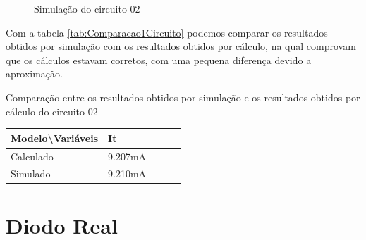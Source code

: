 \begin{figure}[H]
    \centering
    \caption{Simulação do circuito 02}
    \vspace{-0.3cm}
    \label{fig:SimulacaoCircuito02}
\end{figure}

Com a tabela \ref{tab:Comparacao1Circuito} podemos comparar os resultados obtidos por simulação com os resultados obtidos por cálculo, na qual comprovam que os cálculos estavam corretos, com uma pequena diferença devido a aproximação.

\begin{quadro}[H]
    \centering
    \caption{Comparação entre os resultados obtidos por simulação e os resultados obtidos por cálculo do circuito 02}
    \begin{tabular}{|C{0.34\textwidth}|C{0.19\textwidth}|C{0.19\textwidth}|C{0.19\textwidth}|C{0.19\textwidth}|}
        \hline
        \textbf{Modelo\textbackslash{}Variáveis} & \textbf{It} \\
        \hline
        Calculado & 9.207mA \\
        \hline
        Simulado & 9.210mA \\
        \hline
    \end{tabular}
    \vspace{-0.6cm}
    \label{tab:Comparacao1Circuito}
\end{quadro}

\section{Diodo Real}

